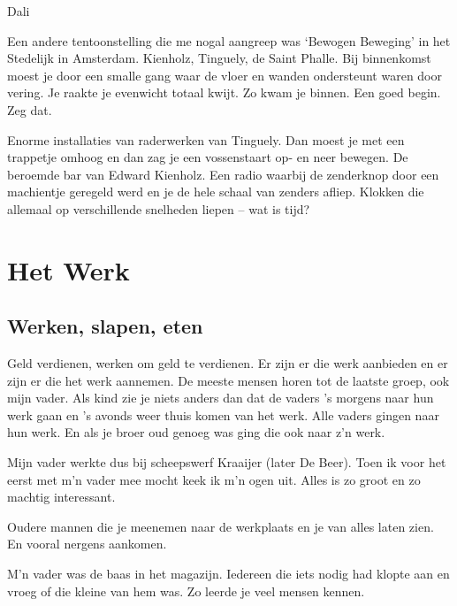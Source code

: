 \documentclass[12pt,twoside]{memoir}
\begin{document}
Dali

Een andere tentoonstelling die me nogal aangreep was ‘Bewogen Beweging’ in het Stedelijk in Amsterdam. Kienholz, Tinguely, de Saint Phalle. Bij binnenkomst moest je door een smalle gang waar de vloer en wanden ondersteunt waren door vering. Je raakte je evenwicht totaal kwijt. Zo kwam je binnen. Een goed begin. Zeg dat.

Enorme installaties van raderwerken van Tinguely. Dan moest je met een trappetje omhoog en dan zag je een vossenstaart op- en neer bewegen. De beroemde bar van Edward Kienholz. Een radio waarbij de zenderknop door een machientje geregeld werd en je de hele schaal van zenders afliep. Klokken die allemaal op verschillende snelheden liepen – wat is tijd? 

\part{Het Werk}

\chapter{Werken, slapen, eten} %
\label{cha:werkenslapen}

Geld verdienen, werken om geld te verdienen. Er zijn er die werk aanbieden en er zijn er die het werk aannemen. De meeste mensen horen tot de laatste groep, ook mijn vader. Als kind zie je niets anders dan dat de vaders ’s morgens naar hun werk gaan en ’s avonds weer thuis komen van het werk. Alle vaders gingen naar hun werk. En als je broer oud genoeg was ging die ook naar z’n werk.

Mijn vader werkte dus bij scheepswerf Kraaijer (later De Beer). Toen ik voor het eerst met m’n vader mee mocht keek ik m’n ogen uit. Alles is zo groot en zo machtig interessant.

Oudere mannen die je meenemen naar de werkplaats en je van alles laten zien. En vooral nergens aankomen. 

M’n vader was de baas in het magazijn. Iedereen die iets nodig had klopte aan en vroeg of die kleine van hem was. Zo leerde je veel mensen kennen. 


\end{document}

